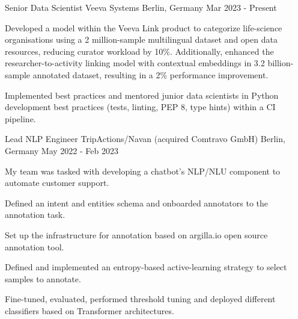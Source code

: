 

\begin{cventries}
  \cventry
    {Senior Data Scientist} %
    {Veeva Systems} %
    {Berlin, Germany} %
    {Mar 2023 - Present } %
	{
      \begin{cvitems} %
		\item {Developed a model within the Veeva Link product to categorize life-science organisations using a 2 million-sample multilingual dataset and open data resources, reducing curator workload by 10\%. Additionally, enhanced the researcher-to-activity linking model with contextual embeddings in 3.2 billion-sample annotated dataset, resulting in a 2\% performance improvement.}
		\item {Implemented best practices and mentored junior data scientists in Python development best practices (tests, linting, PEP 8, type hints) within a CI pipeline.}
      \end{cvitems}
    }

  \cventry
    {Lead NLP Engineer} %
    {TripActions/Navan (acquired Comtravo GmbH)} %
    {Berlin, Germany} %
    {May 2022 - Feb 2023} %
	{
      \begin{cvitems} %
		\item {My team was tasked with developing a chatbot's NLP/NLU component to automate customer support.}
		\item {Defined an intent and entities schema and onboarded annotators to the annotation task.}
		\item {Set up the infrastructure for annotation based on argilla.io open source annotation tool.}
		\item {Defined and implemented an entropy-based active-learning strategy to select samples to annotate.}
		\item {Fine-tuned, evaluated, performed threshold tuning and deployed different classifiers based on Transformer architectures.}
      \end{cvitems}
    }



\end{cventries}
